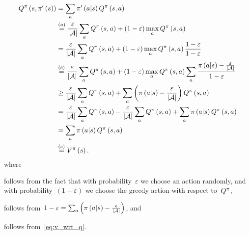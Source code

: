 \begin{align}
	\actionvalue\policyscript\left(\state,\policy'\left(\state\right)\right)
		&=\sum_{\action}\policy'\left(\action\middle\vert\state\right)\actionvalue\policyscript\left(\state,\action\right) \notag \\
		&\overset{(a)}{=}\frac{\varepsilon}{\left\lvert\actionspace\right\rvert}\sum_{\action}\actionvalue\policyscript\left(\state,\action\right)+\left(1-\varepsilon\right)\max_{\action}\actionvalue\policyscript\left(\state,\action\right) \notag \\
		&=\frac{\varepsilon}{\left\lvert\actionspace\right\rvert}\sum_{\action}\actionvalue\policyscript\left(\state,\action\right)+\left(1-\varepsilon\right)\max_{\action}\actionvalue\policyscript\left(\state,\action\right)\frac{1-\varepsilon}{1-\varepsilon} \notag \\
		&\overset{(b)}{=}\frac{\varepsilon}{\left\lvert\actionspace\right\rvert}\sum_{\action}\actionvalue\policyscript\left(\state,\action\right)+\left(1-\varepsilon\right)\max_{\action}\actionvalue\policyscript\left(\state,\action\right)\sum_{\action}\frac{\policy\left(\action\middle\vert\state\right)-\frac{\varepsilon}{\left\lvert\actionspace\right\rvert}}{1-\varepsilon} \notag \\
		&\geq\frac{\varepsilon}{\left\lvert\actionspace\right\rvert}\sum_{\action}\actionvalue\policyscript\left(\state,\action\right)+\sum_{\action}\left(\policy\left(\action\middle\vert\state\right)-\frac{\varepsilon}{\left\lvert\actionspace\right\rvert}\right)\actionvalue\policyscript\left(\state,\action\right) \notag \\
		&=\frac{\varepsilon}{\left\lvert\actionspace\right\rvert}\sum_{\action}\actionvalue\policyscript\left(\state,\action\right)-\frac{\varepsilon}{\left\lvert\actionspace\right\rvert}\sum_{\action}\actionvalue\policyscript\left(\state,\action\right)+\sum_{\action}\policy\left(\action\middle\vert\state\right)\actionvalue\policyscript\left(\state,\action\right) \notag \\
		&=\sum_{\action}\policy\left(\action\middle\vert\state\right)\actionvalue\policyscript\left(\state,\action\right) \notag \\
		&\overset{(c)}{=}\statevalue\policyscript\left(\state\right).
\end{align}
where
\begin{enumerate*}[label=(\alph*)]
	\item follows from the fact that with probability~${\varepsilon}$ we choose an action randomly, and with probability~${\left(1-\varepsilon\right)}$ we choose the greedy action with respect to~${Q^{\pi}}$,
	\item follows from~${1-\varepsilon=\sum_{\action}\left(\policy\left(\action\middle\vert\state\right)-\frac{\epsilon}{\left\lvert\actionspace\right\rvert}\right)}$, and
	\item follows from~\eqref{eq:v_wrt_q}.
\end{enumerate*}
